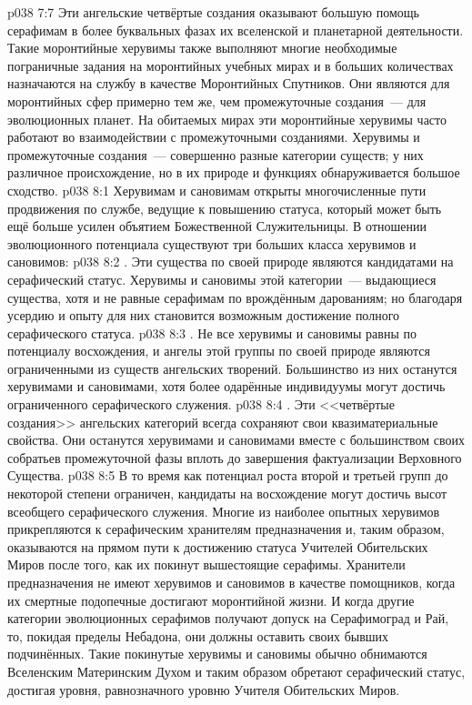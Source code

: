 \vs p038 7:7 Эти ангельские четвёртые создания оказывают большую помощь серафимам в более буквальных фазах их вселенской и планетарной деятельности. Такие моронтийные херувимы также выполняют многие необходимые пограничные задания на моронтийных учебных мирах и в больших количествах назначаются на службу в качестве Моронтийных Спутников. Они являются для моронтийных сфер примерно тем же, чем промежуточные создания~--- для эволюционных планет. На обитаемых мирах эти моронтийные херувимы часто работают во взаимодействии с промежуточными созданиями. Херувимы и промежуточные создания~--- совершенно разные категории существ; у них различное происхождение, но в их природе и функциях обнаруживается большое сходство.
\vs p038 8:1 Херувимам и сановимам открыты многочисленные пути продвижения по службе, ведущие к повышению статуса, который может быть ещё больше усилен объятием Божественной Служительницы. В отношении эволюционного потенциала существуют три больших класса херувимов и сановимов:
\vs p038 8:2 . Эти существа по своей природе являются кандидатами на серафический статус. Херувимы и сановимы этой категории~--- выдающиеся существа, хотя и не равные серафимам по врождённым дарованиям; но благодаря усердию и опыту для них становится возможным достижение полного серафического статуса.
\vs p038 8:3 . Не все херувимы и сановимы равны по потенциалу восхождения, и ангелы этой группы по своей природе являются ограниченными из существ ангельских творений. Большинство из них останутся херувимами и сановимами, хотя более одарённые индивидуумы могут достичь ограниченного серафического служения.
\vs p038 8:4 . Эти <<четвёртые создания>> ангельских категорий всегда сохраняют свои квазиматериальные свойства. Они останутся херувимами и сановимами вместе с большинством своих собратьев промежуточной фазы вплоть до завершения фактуализации Верховного Существа.
\vs p038 8:5 \pc В то время как потенциал роста второй и третьей групп до некоторой степени ограничен, кандидаты на восхождение могут достичь высот всеобщего серафического служения. Многие из наиболее опытных херувимов прикрепляются к серафическим хранителям предназначения и, таким образом, оказываются на прямом пути к достижению статуса Учителей Обительских Миров после того, как их покинут вышестоящие серафимы. Хранители предназначения не имеют херувимов и сановимов в качестве помощников, когда их смертные подопечные достигают моронтийной жизни. И когда другие категории эволюционных серафимов получают допуск на Серафимоград и Рай, то, покидая пределы Небадона, они должны оставить своих бывших подчинённых. Такие покинутые херувимы и сановимы обычно обнимаются Вселенским Материнским Духом и таким образом обретают серафический статус, достигая уровня, равнозначного уровню Учителя Обительских Миров.
